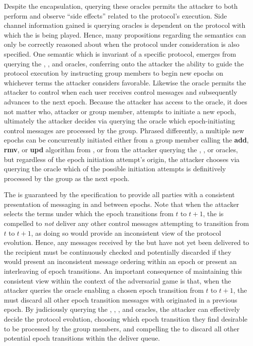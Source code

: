 Despite the encapsulation, querying these oracles permits the attacker to both perform and observe ``side effects'' related to the protocol's execution.
Side channel information gained is querying oracles is dependent on the protocol with which the \CGKAsec is being played.
Hence, many propositions regarding the \CGKAsec semantics can only be correctly reasoned about when the protocol under consideration is also specified.
One semantic which is invariant of a specific protocol, emerges from querying the , , and  oracles, conferring onto the attacker the ability to guide the protocol execution by instructing group members to begin new epochs on whichever terms the attacker considers favorable.
Likewise the  oracle permits the attacker to control when each user receives control messages and subsequently advances to the next epoch.
Because the attacker has access to the  oracle, it does not matter who, attacker or group member, attempts to initiate a new epoch, ultimately the attacker decides via querying the  oracle which epoch-initiating control messages are processed by the group.
Phrased differently, a multiple new epochs can be concurrently initiated either from a group member calling the \textbf{add}, \textbf{rmv}, or \textbf{upd} algorithm from \CGKAdef, or from the attacker querying the , , or  oracles, but regardless of the epoch initiation attempt's origin, the attacker chooses via querying the  oracle which of the possible initiation attempts is definitively processed by the group as the next epoch.

The  is guaranteed by the  specification to provide all parties with a consistent presentation of messaging in and between epochs.
Note that when the attacker selects the terms under which the epoch transitions from \(t\) to \(t+1\), the  is compelled to \emph{not} deliver any other control messages attempting to transition from \(t\) to \(t+1\), as doing so would provide an inconsistent view of the protocol evolution.
Hence, any messages received by the  but have not yet been delivered to the recipient must be continuously checked and potentially discarded if they would present an inconsistent message ordering within an epoch or present an interleaving of epoch transitions.
An important consequence of maintaining this consistent view within the context of the adversarial  game is that, when the attacker queries the  oracle enabling a chosen epoch transition from \(t\) to \(t+1\), the  must discard all other epoch transition messages with originated in a previous epoch.
By judiciously querying the , , , and  oracles, the attacker can effectively decide the protocol evolution, choosing which epoch transition they find desirable to be processed by the group members, and compelling the  to discard all other potential epoch transitions within the deliver queue.

